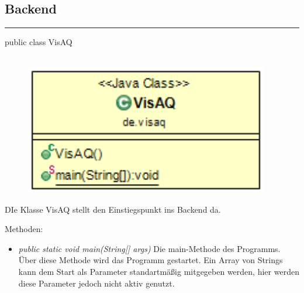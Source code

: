 \subsection{Backend}
\rule{\textwidth}{0.4pt}
public class VisAQ
\\\\
\begin{minipage}{0.4\textwidth}
    \begin{figure}[H]
        {\centering\includegraphics[width=0.95\textwidth]{media/backend/classes/VisAQ.png}}
    \end{figure}
    \end{minipage} \hfill
\begin{minipage}{0.6\textwidth}
    DIe Klasse VisAQ stellt den Einstiegspunkt ins Backend da.
\end{minipage}

Methoden:
\begin{itemize}
    \item \emph{public static void main(String[] args)} Die main-Methode des Programms.
    Über diese Methode wird das Programm gestartet. Ein Array von Strings kann dem Start als Parameter standartmäßig mitgegeben werden, hier werden diese Parameter jedoch nicht aktiv genutzt.
\end{itemize}

